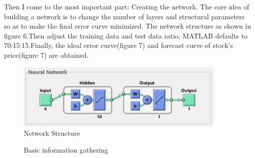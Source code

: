 \documentclass{article}
\begin{document}
Then I come to the most important part: Creating the network. The core idea of building a network is to change the number of layers and structural parameters so as to make the final error curve minimized. The network structure as shown in figure 6.Then adjust the training data and test data ratio, MATLAB defaults to 70:15:15.Finally, the ideal error curve(figure 7) and forecast curve of stock's price(figure 7) are obtained.
\begin{figure}[htb]
    \centering
    \includegraphics[width=4in]{ml1.png}
  	\caption{Network Structure}
\end{figure}
\begin{figure}[htb]
	\centering
	\caption{Basic information gathering}
\end{figure}
\end{document}
